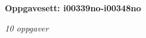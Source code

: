 \centerline{\bf Oppgavesett: i00339no-i00348no}
\vskip 10pt
\centerline{\it 10 oppgaver}\vskip 10pt
\vskip 10pt
